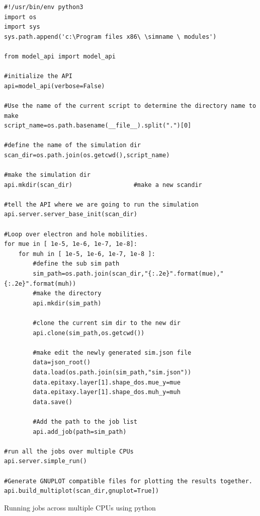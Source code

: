 \begin{listing}
\begin{verbatim}
#!/usr/bin/env python3
import os
import sys
sys.path.append('c:\Program files x86\ \simname \ modules')

from model_api import model_api

#initialize the API
api=model_api(verbose=False)

#Use the name of the current script to determine the directory name to make
script_name=os.path.basename(__file__).split(".")[0]

#define the name of the simulation dir
scan_dir=os.path.join(os.getcwd(),script_name)

#make the simulation dir
api.mkdir(scan_dir)					#make a new scandir

#tell the API where we are going to run the simulation
api.server.server_base_init(scan_dir)

#Loop over electron and hole mobilities.
for mue in [ 1e-5, 1e-6, 1e-7, 1e-8]:
	for muh in [ 1e-5, 1e-6, 1e-7, 1e-8 ]:
		#define the sub sim path
		sim_path=os.path.join(scan_dir,"{:.2e}".format(mue),"{:.2e}".format(muh))
		#make the directory
		api.mkdir(sim_path)

		#clone the current sim dir to the new dir
		api.clone(sim_path,os.getcwd())		

		#make edit the newly generated sim.json file
		data=json_root()
		data.load(os.path.join(sim_path,"sim.json"))
		data.epitaxy.layer[1].shape_dos.mue_y=mue
		data.epitaxy.layer[1].shape_dos.muh_y=muh
		data.save()

		#Add the path to the job list
		api.add_job(path=sim_path)

#run all the jobs over multiple CPUs
api.server.simple_run()

#Generate GNUPLOT compatible files for plotting the results together.
api.build_multiplot(scan_dir,gnuplot=True])

\end{verbatim}
\caption{Running jobs across multiple CPUs using python} 
\label{python-example6}
\end{listing}
